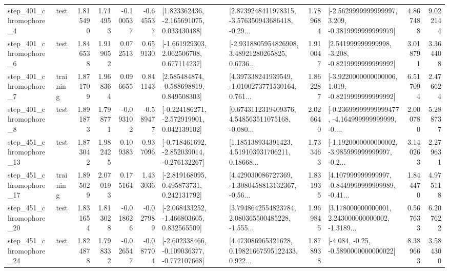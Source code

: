 \begin{tabular}{llrrrrllrlrr}
   step\_401\_chromophore\_4 &      test &      1.815490 &    1.714953 &     -0.100537 & -0.645537 &    [1.823362436, -2.165691075, 0.033430488] &  [2.8739248411978315, -3.576350943686418, -0.29... &       1.789684 &  [-2.5629999999999997, 3.209, -0.3819999999999979] &            4.867488 &          9.022144 \\
   step\_401\_chromophore\_6 &      test &      1.846538 &    1.919052 &      0.072513 &  0.659130 &    [-1.661929303, 2.062506708, 0.677114237] &  [-2.9318805954826908, 3.48921280265825, 0.6736... &       1.910047 &   [2.541999999999998, -3.208, -0.8219999999999992] &            3.018791 &          3.364408 \\
   step\_401\_chromophore\_7 &  training &      1.871709 &    1.968364 &      0.096655 &  0.841143 &    [2.585484874, -0.588698819, 0.849508303] &  [4.397338241939549, -1.0100273771530164, 0.761... &       1.862287 &  [-3.9220000000000006, 1.019, -0.8219999999999992] &            6.517094 &          2.476624 \\
   step\_401\_chromophore\_8 &      test &      1.891873 &    1.798771 &     -0.093102 & -0.589477 &   [-0.224186271, -2.572919901, 0.042139102] &  [0.6743112319409376, 4.548563511075168, -0.080... &       2.026640 &  [-0.23699999999999477, -4.164999999999999, -0.... &            2.000780 &          5.288737 \\
  step\_451\_chromophore\_13 &      test &      1.873042 &    1.982425 &      0.109383 &  0.937096 &  [-0.718461692, -2.852039014, -0.276132267] &  [1.185138934391423, 4.519103931706211, 0.18668... &       1.733463 &  [-1.1920000000000002, -3.985999999999997, -0.2... &            3.140263 &          2.279631 \\
  step\_451\_chromophore\_17 &  training &      1.895029 &    2.070193 &      0.175164 &  1.433036 &    [-2.819168095, 0.495873731, 0.242131792] &  [4.429030086727369, -1.3080458813132367, -0.56... &       1.831935 &  [4.107999999999997, -0.8449999999999989, -0.41... &            1.844470 &          4.975118 \\
  step\_451\_chromophore\_20 &      test &      1.831654 &    1.813028 &     -0.018626 & -0.027989 &   [-2.068433252, -1.466803605, 0.832565509] &  [3.7948642554823784, 2.080365500485228, -1.555... &       1.969845 &  [3.178000000000001, 2.243000000000002, -1.3189... &            0.567633 &          6.207622 \\
  step\_451\_chromophore\_24 &      test &      1.824878 &    1.798332 &     -0.026547 & -0.087704 &  [-2.602338466, -0.109036377, -0.772107668] &  [4.473086965321628, 0.19821667595122433, 0.922... &       1.878938 &               [-4.084, -0.25, -0.5890000000000022] &            8.389663 &          3.584300 \\

\end{tabular}
